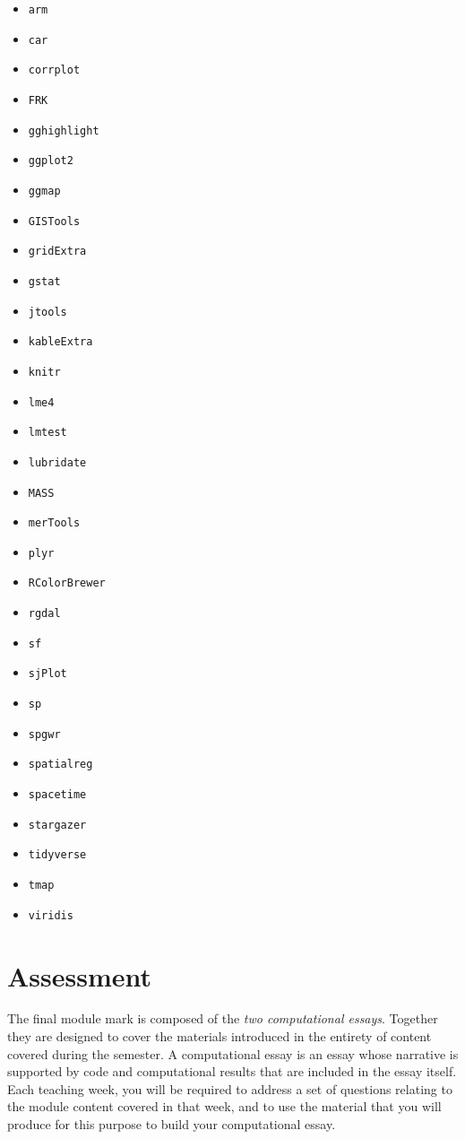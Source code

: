 \documentclass[
  letterpaper,
  DIV=11,
  numbers=noendperiod]{scrreprt}
\providecommand{\tightlist}{%
  \setlength{\itemsep}{0pt}\setlength{\parskip}{0pt}}\usepackage{longtable,booktabs,array}
\begin{document}
\begin{itemize}
\tightlist
\item
  \texttt{arm}
\item
  \texttt{car}
\item
  \texttt{corrplot}
\item
  \texttt{FRK}
\item
  \texttt{gghighlight}
\item
  \texttt{ggplot2}
\item
  \texttt{ggmap}
\item
  \texttt{GISTools}
\item
  \texttt{gridExtra}
\item
  \texttt{gstat}
\item
  \texttt{jtools}
\item
  \texttt{kableExtra}
\item
  \texttt{knitr}
\item
  \texttt{lme4}
\item
  \texttt{lmtest}
\item
  \texttt{lubridate}
\item
  \texttt{MASS}
\item
  \texttt{merTools}
\item
  \texttt{plyr}
\item
  \texttt{RColorBrewer}
\item
  \texttt{rgdal}
\item
  \texttt{sf}
\item
  \texttt{sjPlot}
\item
  \texttt{sp}
\item
  \texttt{spgwr}
\item
  \texttt{spatialreg}
\item
  \texttt{spacetime}
\item
  \texttt{stargazer}
\item
  \texttt{tidyverse}
\item
  \texttt{tmap}
\item
  \texttt{viridis}
\end{itemize}

\hypertarget{assessment}{%
\section{Assessment}\label{assessment}}

The final module mark is composed of the \emph{two computational
essays}. Together they are designed to cover the materials introduced in
the entirety of content covered during the semester. A computational
essay is an essay whose narrative is supported by code and computational
results that are included in the essay itself. Each teaching week, you
will be required to address a set of questions relating to the module
content covered in that week, and to use the material that you will
produce for this purpose to build your computational essay.
\end{document}

